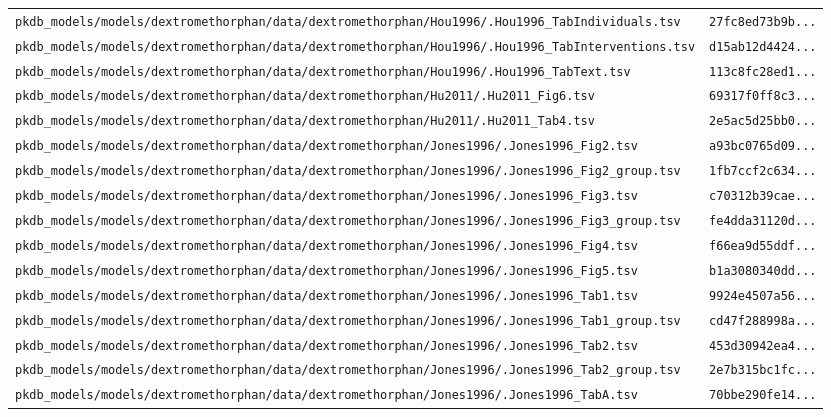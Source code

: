 \begin{longtable}{ll}
\texttt{pkdb\_models/models/dextromethorphan/data/dextromethorphan/Hou1996/.Hou1996\_TabIndividuals.tsv} & \texttt{27fc8ed73b9b...} \\
\texttt{pkdb\_models/models/dextromethorphan/data/dextromethorphan/Hou1996/.Hou1996\_TabInterventions.tsv} & \texttt{d15ab12d4424...} \\
\texttt{pkdb\_models/models/dextromethorphan/data/dextromethorphan/Hou1996/.Hou1996\_TabText.tsv} & \texttt{113c8fc28ed1...} \\
\texttt{pkdb\_models/models/dextromethorphan/data/dextromethorphan/Hu2011/.Hu2011\_Fig6.tsv} & \texttt{69317f0ff8c3...} \\
\texttt{pkdb\_models/models/dextromethorphan/data/dextromethorphan/Hu2011/.Hu2011\_Tab4.tsv} & \texttt{2e5ac5d25bb0...} \\
\texttt{pkdb\_models/models/dextromethorphan/data/dextromethorphan/Jones1996/.Jones1996\_Fig2.tsv} & \texttt{a93bc0765d09...} \\
\texttt{pkdb\_models/models/dextromethorphan/data/dextromethorphan/Jones1996/.Jones1996\_Fig2\_group.tsv} & \texttt{1fb7ccf2c634...} \\
\texttt{pkdb\_models/models/dextromethorphan/data/dextromethorphan/Jones1996/.Jones1996\_Fig3.tsv} & \texttt{c70312b39cae...} \\
\texttt{pkdb\_models/models/dextromethorphan/data/dextromethorphan/Jones1996/.Jones1996\_Fig3\_group.tsv} & \texttt{fe4dda31120d...} \\
\texttt{pkdb\_models/models/dextromethorphan/data/dextromethorphan/Jones1996/.Jones1996\_Fig4.tsv} & \texttt{f66ea9d55ddf...} \\
\texttt{pkdb\_models/models/dextromethorphan/data/dextromethorphan/Jones1996/.Jones1996\_Fig5.tsv} & \texttt{b1a3080340dd...} \\
\texttt{pkdb\_models/models/dextromethorphan/data/dextromethorphan/Jones1996/.Jones1996\_Tab1.tsv} & \texttt{9924e4507a56...} \\
\texttt{pkdb\_models/models/dextromethorphan/data/dextromethorphan/Jones1996/.Jones1996\_Tab1\_group.tsv} & \texttt{cd47f288998a...} \\
\texttt{pkdb\_models/models/dextromethorphan/data/dextromethorphan/Jones1996/.Jones1996\_Tab2.tsv} & \texttt{453d30942ea4...} \\
\texttt{pkdb\_models/models/dextromethorphan/data/dextromethorphan/Jones1996/.Jones1996\_Tab2\_group.tsv} & \texttt{2e7b315bc1fc...} \\
\texttt{pkdb\_models/models/dextromethorphan/data/dextromethorphan/Jones1996/.Jones1996\_TabA.tsv} & \texttt{70bbe290fe14...} \\

\end{longtable}
